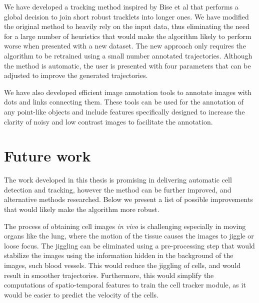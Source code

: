 We have developed a tracking method inspired by Bise et al \cite{bise11global} that performs a global decision to join short robust tracklets into longer ones. We have modified the original method to heavily rely on the input data, thus eliminating the need for a large number of heuristics that would make the algorithm likely to perform worse when presented with a new dataset. The new approach only requires the algorithm to be retrained using a small number annotated trajectories. Although the method is automatic, the user is presented with four parameters that can be adjusted to improve the generated trajectories. 

We have also developed efficient image annotation tools to annotate images with dots and links connecting them. These tools can be used for the annotation of any point-like objects and include features specifically designed to increase the clarity of noisy and low contrast images to facilitate the annotation.



\section{Future work \statusfirstdraft}
\label{sec:conclusion_futurework}

The work developed in this thesis is promising in delivering automatic cell detection and tracking, however the method can be further improved, and alternative methods researched. Below we present a list of possible improvements that would likely make the algorithm more robust.

The process of obtaining cell images \textit{in vivo} is challenging especially in moving organs like the lung, where the motion of the tissue causes the images to jiggle or loose focus. The jiggling can be eliminated using a pre-processing step that would stabilize the images using the information hidden in the background of the images, such blood vessels. This would reduce the jiggling of cells, and would result in smoother trajectories. Furthermore, this would simplify the computations of spatio-temporal features to train the cell tracker module, as it would be easier to predict the velocity of the cells.

